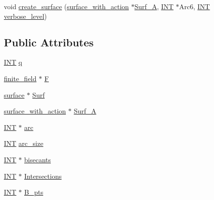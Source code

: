\begin{DoxyCompactItemize}
\item 
void \mbox{\hyperlink{classarc__lifting_a2b1fd46281de9ff3fef00fc122d39b2b}{create\+\_\+surface}} (\mbox{\hyperlink{classsurface__with__action}{surface\+\_\+with\+\_\+action}} $\ast$\mbox{\hyperlink{classarc__lifting_a40cc904d89201e5ddf4ae210f973ae85}{Surf\+\_\+A}}, \mbox{\hyperlink{galois_8h_a09fddde158a3a20bd2dcadb609de11dc}{I\+NT}} $\ast$Arc6, \mbox{\hyperlink{galois_8h_a09fddde158a3a20bd2dcadb609de11dc}{I\+NT}} \mbox{\hyperlink{simeon_8_c_a818073fbcc2f439e7c56952f67386122}{verbose\+\_\+level}})
\end{DoxyCompactItemize}
\subsection*{Public Attributes}
\begin{DoxyCompactItemize}
\item 
\mbox{\hyperlink{galois_8h_a09fddde158a3a20bd2dcadb609de11dc}{I\+NT}} \mbox{\hyperlink{classarc__lifting_a1b6e763798ebd935e133ac329552f4ac}{q}}
\item 
\mbox{\hyperlink{classfinite__field}{finite\+\_\+field}} $\ast$ \mbox{\hyperlink{classarc__lifting_a4c28c4b40354202b45684a0a73e33f4b}{F}}
\item 
\mbox{\hyperlink{classsurface}{surface}} $\ast$ \mbox{\hyperlink{classarc__lifting_a72a06b0ca94b529ff8b9881422570634}{Surf}}
\item 
\mbox{\hyperlink{classsurface__with__action}{surface\+\_\+with\+\_\+action}} $\ast$ \mbox{\hyperlink{classarc__lifting_a40cc904d89201e5ddf4ae210f973ae85}{Surf\+\_\+A}}
\item 
\mbox{\hyperlink{galois_8h_a09fddde158a3a20bd2dcadb609de11dc}{I\+NT}} $\ast$ \mbox{\hyperlink{classarc__lifting_a057e6c4873d8090f42ff29c9a8283820}{arc}}
\item 
\mbox{\hyperlink{galois_8h_a09fddde158a3a20bd2dcadb609de11dc}{I\+NT}} \mbox{\hyperlink{classarc__lifting_a22856d8038ab145b6e6541c0f311eacc}{arc\+\_\+size}}
\item 
\mbox{\hyperlink{galois_8h_a09fddde158a3a20bd2dcadb609de11dc}{I\+NT}} $\ast$ \mbox{\hyperlink{classarc__lifting_a7c24ebd0efe0ac6657ff03bd2979722f}{bisecants}}
\item 
\mbox{\hyperlink{galois_8h_a09fddde158a3a20bd2dcadb609de11dc}{I\+NT}} $\ast$ \mbox{\hyperlink{classarc__lifting_ad2d55af29289bfcab81a2e163beb7213}{Intersections}}
\item 
\mbox{\hyperlink{galois_8h_a09fddde158a3a20bd2dcadb609de11dc}{I\+NT}} $\ast$ \mbox{\hyperlink{classarc__lifting_aa934ddb95499b6af7e1c4c598e51814d}{B\+\_\+pts}}

\end{DoxyCompactItemize}
